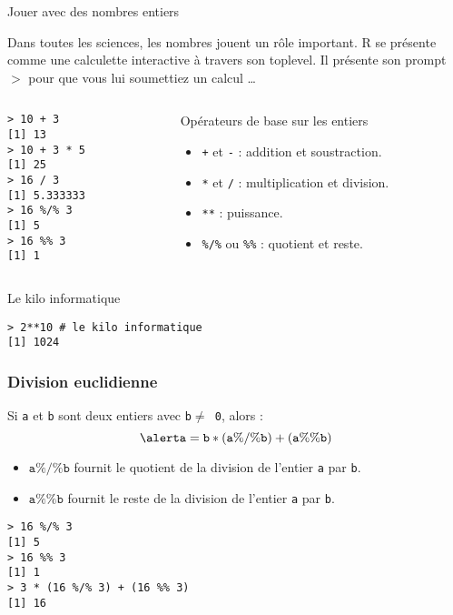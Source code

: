 \documentclass[10pt]{beamer}
\begin{document}
\begin{frame}[fragile]{Jouer avec des nombres entiers}
  \begin{alertblock}{Dans toutes les sciences, les nombres jouent un rôle important.}
    R se présente comme une calculette interactive à travers son \alert{toplevel}.
    Il présente son \alert{prompt $>$} pour que vous lui soumettiez un calcul \dots
  \end{alertblock}

\begin{columns}[t]
\begin{column}{0.38\textwidth}
\begin{lstlisting}
> 10 + 3
[1] 13
> 10 + 3 * 5
[1] 25
> 16 / 3
[1] 5.333333
> 16 %/% 3
[1] 5
> 16 %% 3
[1] 1
\end{lstlisting}
\end{column}
\begin{column}{0.58\textwidth}
  \begin{block}{Opérateurs de base sur les entiers}
    \begin{itemize}
    \item \texttt{+} et \texttt{-} : addition et soustraction.
    \item \texttt{*} et \texttt{/} : multiplication et division.
    \item \texttt{**} : puissance.
    \item \texttt{\%/\%} ou \texttt{\%\%} : quotient et reste.
    \end{itemize}
  \end{block}
\end{column}
\end{columns}
\begin{exampleblock}{Le kilo informatique}
\begin{lstlisting}[style=block]
> 2**10 # le kilo informatique
[1] 1024
\end{lstlisting}
\end{exampleblock}
\end{frame}

\begin{frame}[fragile]
  \frametitle{Division euclidienne}
  Si \texttt{a} et \texttt{b} sont deux entiers avec \texttt{b$\neq$ 0}, alors :
  \[
    \alert{\mathtt{a = b * (a \%/\% b) + (a \%\% b)}}
  \]
  \begin{itemize}
  \item \alert{$\mathtt{a \%/\% b}$} fournit le \alert{quotient} de la division de l'entier \texttt{a} par \texttt{b}.
  \item \alert{$\mathtt{a \%\% b}$} fournit le \alert{reste} de la division de l'entier \texttt{a} par \texttt{b}.

  \end{itemize}


  \begin{lstlisting}
> 16 %/% 3
[1] 5
> 16 %% 3
[1] 1
> 3 * (16 %/% 3) + (16 %% 3)
[1] 16
  \end{lstlisting}
\end{frame}
\end{document}
